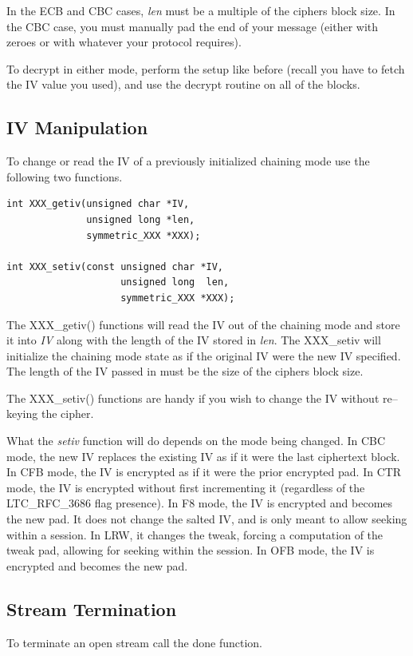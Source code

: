 \documentclass[synpaper]{book}
\begin{document}
In the ECB and CBC cases, \textit{len} must be a multiple of the ciphers block size.  In the CBC case, you must manually pad the end of your message (either with
zeroes or with whatever your protocol requires).

To decrypt in either mode, perform the setup like before (recall you have to fetch the IV value you used), and use the decrypt routine on all of the blocks.

\subsection{IV Manipulation}
To change or read the IV of a previously initialized chaining mode use the following two functions.
     
 
\begin{verbatim}
int XXX_getiv(unsigned char *IV,
              unsigned long *len,
              symmetric_XXX *XXX);

int XXX_setiv(const unsigned char *IV,
                    unsigned long  len,
                    symmetric_XXX *XXX);
\end{verbatim}

The XXX\_getiv() functions will read the IV out of the chaining mode and store it into \textit{IV} along with the length of the IV
stored in \textit{len}.  The XXX\_setiv will initialize the chaining mode state as if the original IV were the new IV specified.  The length
of the IV passed in must be the size of the ciphers block size.

The XXX\_setiv() functions are handy if you wish to change the IV without re--keying the cipher.

What the \textit{setiv} function will do depends on the mode being changed.  In CBC mode, the new IV replaces the existing IV as if it
were the last ciphertext block.  In CFB mode, the IV is encrypted as if it were the prior encrypted pad.  In CTR mode, the IV is encrypted without
first incrementing it (regardless of the LTC\_RFC\_3686 flag presence).  In F8 mode, the IV is encrypted and becomes the new pad.  It does not change
the salted IV, and is only meant to allow seeking within a session.  In LRW, it changes the tweak, forcing a computation of the tweak pad, allowing for
seeking within the session.  In OFB mode, the IV is encrypted and becomes the new pad.

\subsection{Stream Termination}
To terminate an open stream call the done function.
\end{document}
